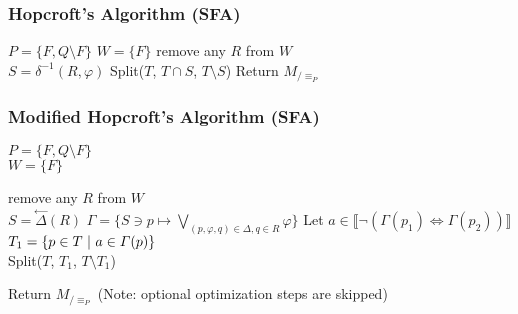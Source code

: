 \documentclass[12pt]{beamer}
\newcommand{\suchthat}{\hphantom l | \hphantom l}
\newcommand{\denotation}[1]{\llbracket #1 \rrbracket}
\begin{document}
\begin{frame}
\frametitle{Hopcroft's Algorithm (SFA)}
\begin{algorithm}[H]
$P = \{ F, Q \setminus F \}$ 
$W = \{F\} $ 
{
	remove any $R$ from $W$\\
	{
		$S = \delta^{-1} (R, \varphi)$ 
		{
			{
				Split($T$, $T \cap S$, $T \setminus S$) 
			}
		}
	}
}
Return $M_{/\equiv_P}$
\end{algorithm}

\end{frame}

\begin{frame}
\frametitle{Modified Hopcroft's Algorithm (SFA)}
\begin{algorithm}[H]
$P = \{ F, Q \setminus F \}$ \\
$W = \{F\} $\\
{
	remove any $R$ from $W$\\
	$S = \overset{\leftarrow}{\Delta}(R)$ 
	$\varGamma = \{S \ni p \mapsto \bigvee_{(p,\varphi,q) \in \Delta, q \in R}\varphi\}$ 
	{
		Let $a \in \denotation{\neg(\varGamma(p_1) \iff \varGamma(p_2))}$\\
		$T_1 = \{ p \in T \suchthat a \in \varGamma(p)\}$\\
		Split($T$, $T_1$, $T \setminus T_1$)
	}

}
Return $M_{/\equiv_P}$ (Note: optional optimization steps are skipped)
\end{algorithm}
\end{frame}
\end{document}
